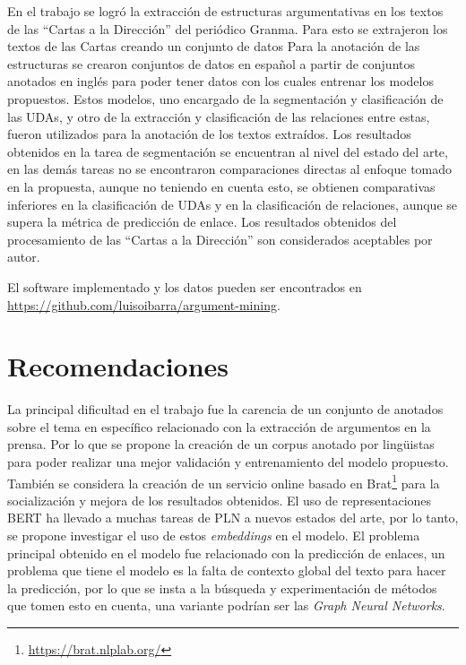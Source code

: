 \documentclass[a4paper,11pt,twocolumn,twoside]{article}
\begin{document}
En el trabajo se logró la extracción de estructuras argumentativas en los textos de las 
``Cartas a la Dirección'' del periódico Granma. Para esto se 
extrajeron los textos de las Cartas creando un conjunto de datos
Para la anotación de las estructuras se crearon conjuntos de datos en español a partir de conjuntos 
anotados en inglés para poder 
tener datos con los cuales entrenar los modelos propuestos. Estos modelos, uno encargado 
de la segmentación y clasificación de las UDAs, y otro de la extracción y clasificación de las 
relaciones entre estas, fueron utilizados para la anotación de los textos extraídos.
Los resultados obtenidos en la tarea de segmentación se encuentran al nivel del estado del arte,
en las demás tareas no se encontraron comparaciones directas al enfoque tomado en la propuesta,
aunque no teniendo en cuenta esto, se obtienen comparativas inferiores en la clasificación
de UDAs y en la clasificación de relaciones, aunque se supera la métrica de predicción de enlace. 
Los resultados obtenidos del procesamiento de las ``Cartas a la Dirección'' son considerados 
aceptables por autor.

El software implementado y los datos pueden ser encontrados en \url{https://github.com/luisoibarra/argument-mining}.

\section{Recomendaciones}

La principal dificultad en el trabajo fue la carencia de un conjunto de anotados
sobre el tema en específico relacionado con la extracción de argumentos en la prensa.
Por lo que se propone la creación de un corpus anotado por lingüistas para poder realizar una mejor 
validación y entrenamiento del modelo propuesto. También se considera la creación de un servicio 
online basado en Brat\footnote{\url{https://brat.nlplab.org/}} para la socialización y mejora de 
los resultados obtenidos.
El uso de representaciones BERT ha llevado a muchas tareas de PLN a nuevos estados 
del arte, por lo tanto, se propone investigar el uso de estos \textit{embeddings} en 
el modelo. El problema principal obtenido en el modelo fue relacionado con la 
predicción de enlaces, un problema que tiene el modelo es la falta de contexto global
del texto para hacer la predicción, por lo que se insta a la búsqueda y experimentación
de métodos que tomen esto en cuenta, una variante podrían ser las \textit{Graph Neural Networks}.
\end{document}
